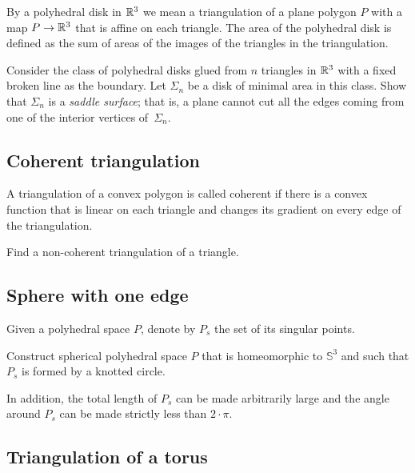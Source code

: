 By a polyhedral disk in $\mathbb{R}^3$
we mean a triangulation of a plane polygon $P$ with a map $P\to\mathbb{R}^3$ that is affine on each triangle.
The area of the polyhedral disk is defined as the sum of areas of the images of the triangles in the triangulation.

\begin{pr}
Consider the  class of polyhedral disks glued from $n$ triangles in $\mathbb{R}^3$ 
with a fixed broken line as the boundary.
Let $\Sigma_n$ be a disk of minimal area in this class.
Show that $\Sigma_n$ is a \emph{saddle surface};
that is, a plane cannot cut all the edges coming from one of the interior vertices of~$\Sigma_n$.
\end{pr}

\subsection*{Coherent triangulation\easy}\label{Coherent triangulation} 

A triangulation of a convex polygon is called coherent if there is a convex function that is linear on each triangle and changes its gradient on every edge of the triangulation.

\begin{pr}
Find a non-coherent triangulation of a triangle.
\end{pr}



\subsection*{Sphere with one edge\hard}\label{panov-S^3} 

Given  a polyhedral space $P$,
denote by $P_s$ the set of its 
singular points.

\begin{pr}
Construct spherical polyhedral space $P$ that is homeomorphic to $\mathbb{S}^3$ and such that $P_s$ is formed by a knotted circle.
\end{pr}

In addition, the total length of $P_s$ can be made arbitrarily large and the angle around $P_s$ can be made strictly less than $2\cdot\pi$.

\subsection*{Triangulation of a torus}\label{Triangulation of a torus}

